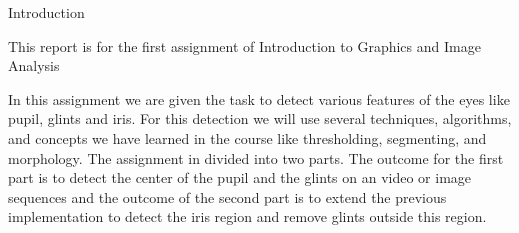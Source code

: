 Introduction

This report is for the first assignment of Introduction to Graphics and Image Analysis 

In this assignment we are given the task to detect various features of the eyes like pupil, glints and iris. For this detection we will use several techniques, algorithms, and concepts we have learned in the course like thresholding, segmenting, and morphology. The assignment in divided into two parts. The outcome for the first part is to detect the center of the pupil and the glints on an video or image sequences and the outcome of the second part is to extend the previous implementation to detect the iris region and remove glints outside this region.
